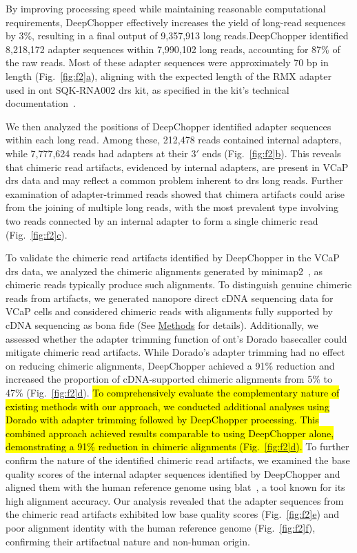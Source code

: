 \documentclass[pdflatex,sn-nature, lineno]{sn-jnl}%
\newcommand{\figref}[2]{Fig.~\hyperref[#1]{\ref*{#1}#2}}
\begin{document}
By improving processing speed while maintaining reasonable computational requirements, DeepChopper effectively increases the yield of long-read sequences by 3\%, resulting in a final output of 9,357,913 long reads.DeepChopper identified 8,218,172 adapter sequences within 7,990,102 long reads, accounting for 87\% of the raw reads.
Most of these adapter sequences were approximately 70 bp in length (\figref{fig:f2}{a}), aligning with the expected length of the RMX adapter used in \gls{ont} SQK-RNA002 \gls{drs} kit, as specified in the kit's technical documentation~\cite{nano2017tech}.

We then analyzed the positions of DeepChopper identified adapter sequences within each long read.
Among these, 212,478 reads contained internal adapters, while 7,777,624 reads had adapters at their $3'$ ends (\figref{fig:f2}{b}).
This reveals that chimeric read artifacts, evidenced by internal adapters, are present in VCaP \gls{drs} data and may reflect a common problem inherent to \gls{drs} long reads.
Further examination of adapter-trimmed reads showed that chimera artifacts could arise from the joining of multiple long reads, with the most prevalent type involving two reads connected by an internal adapter to form a single chimeric read (\figref{fig:f2}{c}).

To validate the chimeric read artifacts identified by DeepChopper in the VCaP \gls{drs} data, we analyzed the chimeric alignments generated by minimap2~\cite{li2018minimap2}, as chimeric reads typically produce such alignments.
To distinguish genuine chimeric reads from artifacts, we generated nanopore direct cDNA sequencing data for VCaP cells and considered chimeric reads with alignments fully supported by cDNA sequencing as bona fide (See \hyperref[sec:methods]{Methods} for details).
Additionally, we assessed whether the adapter trimming function of \gls{ont}'s Dorado basecaller could mitigate chimeric read artifacts.
While Dorado's adapter trimming had no effect on reducing chimeric alignments, DeepChopper achieved a 91\% reduction and increased the proportion of cDNA-supported chimeric alignments from 5\% to 47\% (\figref{fig:f2}{d}).
\hl{To comprehensively evaluate the complementary nature of existing methods with our approach, we conducted additional analyses using Dorado with adapter trimming followed by DeepChopper processing. This combined approach achieved results comparable to using DeepChopper alone, demonstrating a 91\% reduction in chimeric alignments (\mbox{\figref{fig:f2}{d}}).}
To further confirm the nature of the identified chimeric read artifacts, we examined the base quality scores of the internal adapter sequences identified by DeepChopper and aligned them with the human reference genome using \gls{blat}~\cite{kent2002blat}, a tool known for its high alignment accuracy.
Our analysis revealed that the adapter sequences from the chimeric read artifacts exhibited low base quality scores (\figref{fig:f2}{e}) and poor alignment identity with the human reference genome (\figref{fig:f2}{f}), confirming their artifactual nature and non-human origin.
\end{document}
